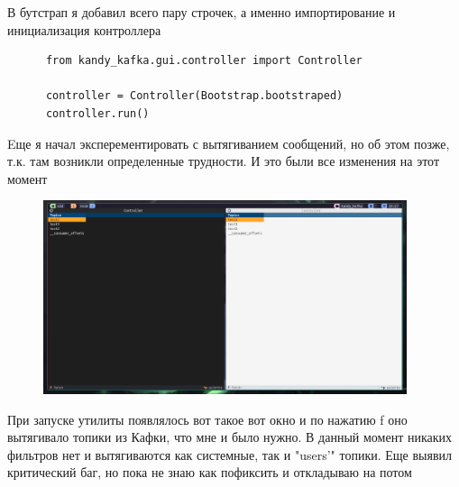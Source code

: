 \documentclass[10pt , a4paper]{report}
\newenvironment{code}{\captionsetup{type=listing}}{}
\begin{document}
В бутстрап я добавил всего пару строчек, а именно импортирование и инициализация контроллера

\begin{code}
  \begin{verbatim}
      from kandy_kafka.gui.controller import Controller
      
      controller = Controller(Bootstrap.bootstraped)
      controller.run()
  \end{verbatim}
\end{code}
Eще я начал эксперементировать с вытягиванием сообщений, но об этом позже, т.к. там возникли определенные трудности. И это были все изменения на этот момент

\begin{figure}[htbp]
  \begin{center}
    \includegraphics[width=0.95\textwidth]{imgs/TextualFirstScreen.png}
  \end{center}
  \caption{}\label{fig:}
\end{figure}

При запуске утилиты появлялось вот такое вот окно и по нажатию f оно вытягивало топики из Кафки, что мне и было нужно. В данный момент никаких фильтров нет и вытягиваются как системные, так и "users'" топики. Еще выявил критический баг, но пока не знаю как пофиксить и откладываю на потом
\end{document}

